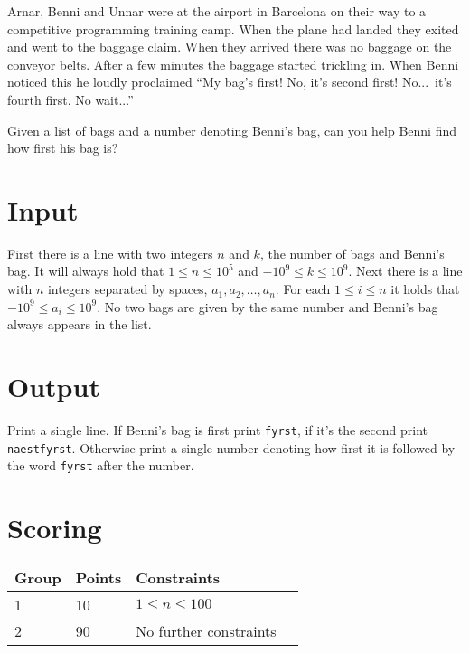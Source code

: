 
Arnar, Benni and Unnar were at the airport in Barcelona on their way to a competitive programming training camp.
When the plane had landed they exited and went to the baggage claim.
When they arrived there was no baggage on the conveyor belts.
After a few minutes the baggage started trickling in.
When Benni noticed this he loudly proclaimed
``My bag's first! No, it's second first! No...\ it's fourth first. No wait...''

Given a list of bags and a number denoting Benni's bag,
can you help Benni find how first his bag is?

\section*{Input}
First there is a line with two integers $n$ and $k$,
the number of bags and Benni's bag.
It will always hold that $1 \leq n \leq 10^5$ and $-10^9 \leq k \leq 10^9$.
Next there is a line with $n$ integers separated by spaces, $a_1, a_2, \dotsc, a_n$.
For each $1 \leq i \leq n$ it holds that $-10^9 \leq a_i \leq 10^9$.
No two bags are given by the same number and Benni's bag always appears in the list.

\section*{Output}
Print a single line.
If Benni's bag is first print \texttt{fyrst},
if it's the second print \texttt{naestfyrst}.
Otherwise print a single number denoting how first it is
followed by the word \texttt{fyrst} after the number.

\section*{Scoring}
\begin{tabular}{|l|l|l|l|}
\hline
Group & Points & Constraints \\ \hline
1     & 10  & $1 \leq n \leq 100$ \\ \hline
2     & 90  & No further constraints \\ \hline
\end{tabular}
